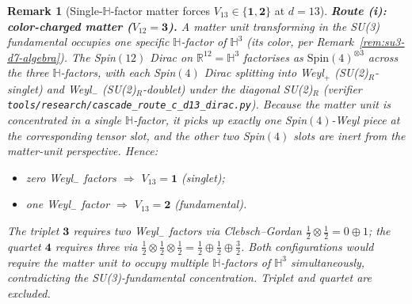 \documentclass[12pt,a4paper]{article}
\newtheorem{remark}[theorem]{Remark}
\begin{document}
\begin{remark}[Single-$\mathbb{H}$-factor matter forces $V_{13}\in\{\mathbf{1},\mathbf{2}\}$ at $d=13$]
\medskip\noindent\textbf{Route (i): color-charged matter ($V_{12}=\mathbf{3}$).}
A matter unit transforming in the SU(3) fundamental occupies one
specific $\mathbb{H}$-factor of $\mathbb{H}^3$ (its color, per
Remark~\ref{rem:su3-d7-algebra}). The Spin$(12)$ Dirac on
$\mathbb{R}^{12}=\mathbb{H}^3$ factorises as $\mathrm{Spin}(4)^{\otimes 3}$
across the three $\mathbb{H}$-factors, with each Spin$(4)$ Dirac
splitting into Weyl$_+$ (SU(2)$_R$-singlet) and Weyl$_-$
(SU(2)$_R$-doublet) under the diagonal SU(2)$_R$
(verifier \texttt{tools/research/cascade\_route\_c\_d13\_dirac.py}).
Because the matter unit is concentrated in a single
$\mathbb{H}$-factor, it picks up exactly one Spin$(4)$-Weyl piece at
the corresponding tensor slot, and the other two Spin$(4)$ slots are
inert from the matter-unit perspective. Hence:
\begin{itemize}
\item zero Weyl$_-$ factors $\Rightarrow$ $V_{13}=\mathbf{1}$ (singlet);
\item one Weyl$_-$ factor $\Rightarrow$ $V_{13}=\mathbf{2}$ (fundamental).
\end{itemize}
The triplet $\mathbf{3}$ requires two Weyl$_-$ factors via
Clebsch--Gordan $\tfrac{1}{2}\otimes\tfrac{1}{2}=0\oplus 1$; the
quartet $\mathbf{4}$ requires three via
$\tfrac{1}{2}\otimes\tfrac{1}{2}\otimes\tfrac{1}{2}=\tfrac{1}{2}\oplus
\tfrac{1}{2}\oplus\tfrac{3}{2}$. Both configurations would require the
matter unit to occupy multiple $\mathbb{H}$-factors of $\mathbb{H}^3$
simultaneously, contradicting the SU(3)-fundamental concentration.
Triplet and quartet are excluded.


\end{remark}
\end{document}
